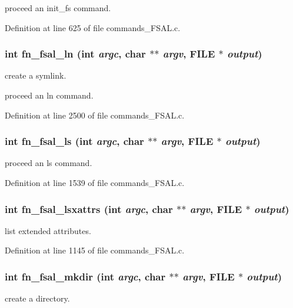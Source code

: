 proceed an init\_\-fs command. 

Definition at line 625 of file commands\_\-FSAL.c.
\subsubsection[{fn\_\-fsal\_\-ln}]{\setlength{\rightskip}{0pt plus 5cm}int fn\_\-fsal\_\-ln (int {\em argc}, \/  char $\ast$$\ast$ {\em argv}, \/  FILE $\ast$ {\em output})}\label{commands_8h_a8499a47dcd7307683cfde786a7bed5e2}
create a symlink.

proceed an ln command. 

Definition at line 2500 of file commands\_\-FSAL.c.
\subsubsection[{fn\_\-fsal\_\-ls}]{\setlength{\rightskip}{0pt plus 5cm}int fn\_\-fsal\_\-ls (int {\em argc}, \/  char $\ast$$\ast$ {\em argv}, \/  FILE $\ast$ {\em output})}\label{commands_8h_a07b7bb33d2fb103bd10446701b19015d}
proceed an ls command. 

Definition at line 1539 of file commands\_\-FSAL.c.
\subsubsection[{fn\_\-fsal\_\-lsxattrs}]{\setlength{\rightskip}{0pt plus 5cm}int fn\_\-fsal\_\-lsxattrs (int {\em argc}, \/  char $\ast$$\ast$ {\em argv}, \/  FILE $\ast$ {\em output})}\label{commands_8h_a00fa31116fbbb892b0dfdd2b4b5d0c48}
list extended attributes. 

Definition at line 1145 of file commands\_\-FSAL.c.
\subsubsection[{fn\_\-fsal\_\-mkdir}]{\setlength{\rightskip}{0pt plus 5cm}int fn\_\-fsal\_\-mkdir (int {\em argc}, \/  char $\ast$$\ast$ {\em argv}, \/  FILE $\ast$ {\em output})}\label{commands_8h_afba8a873b1230bb40c5b57b56f30e600}
create a directory.

